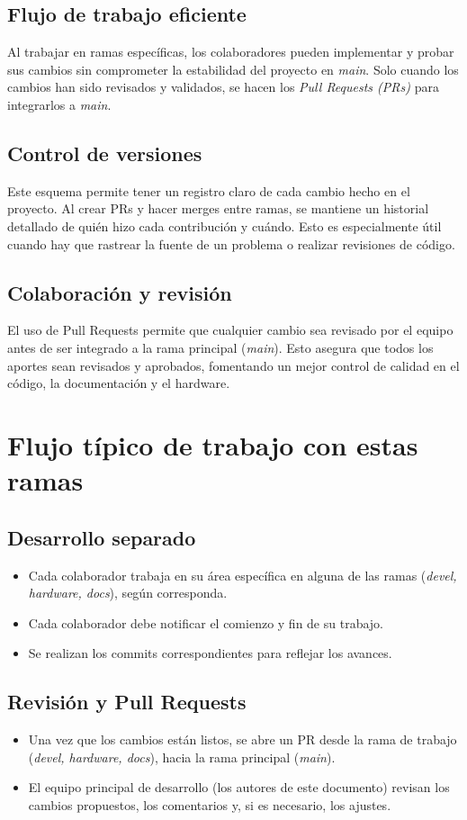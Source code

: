 \documentclass[a4paper]{article}
\begin{document}
    \subsection{Flujo de trabajo eficiente}
    \indent Al trabajar en ramas específicas, los colaboradores pueden implementar y probar sus cambios sin comprometer la estabilidad del proyecto en \textit{main}. Solo cuando los cambios han sido revisados y validados, se hacen los \textit{Pull Requests (PRs)} para integrarlos a \textit{main}.
    \subsection{Control de versiones}
    \indent Este esquema permite tener un registro claro de cada cambio hecho en el proyecto. Al crear PRs y hacer merges entre ramas, se mantiene un historial detallado de quién hizo cada contribución y cuándo. Esto es especialmente útil cuando hay que rastrear la fuente de un problema o realizar revisiones de código.
    \subsection{Colaboración y revisión}
    El uso de Pull Requests permite que cualquier cambio sea revisado por el equipo antes de ser integrado a la rama principal (\textit{main}). Esto asegura que todos los aportes sean revisados y aprobados, fomentando un mejor control de calidad en el código, la documentación y el hardware.

\section{Flujo típico de trabajo con estas ramas}
    \subsection{Desarrollo separado}
        \begin{itemize}
            \item Cada colaborador trabaja en su área específica en alguna de las ramas (\textit{devel, hardware, docs}), según corresponda.
            \item Cada colaborador debe notificar el comienzo y fin de su trabajo.
            \item Se realizan los commits correspondientes para reflejar los avances.
        \end{itemize}

    \subsection{Revisión y Pull Requests}
        \begin{itemize}
            \item Una vez que los cambios están listos, se abre un PR desde la rama de trabajo (\textit{devel, hardware, docs}), hacia la rama principal (\textit{main}).
            \item El equipo principal de desarrollo (los autores de este documento) revisan los cambios propuestos, los comentarios y, si es necesario, los ajustes.
        \end{itemize}
\end{document}
